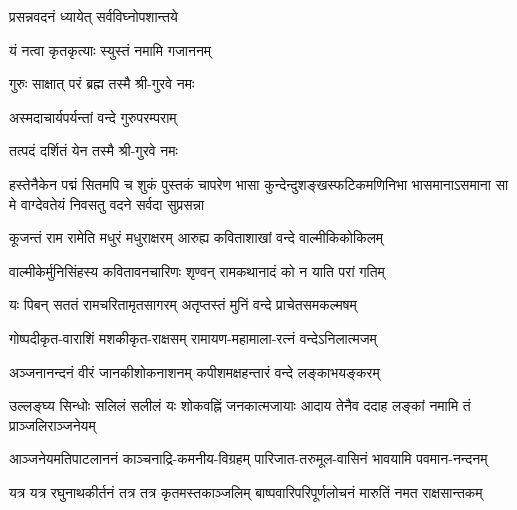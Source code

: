 

{प्रसन्नवदनं ध्यायेत् सर्वविघ्नोपशान्तये}

{यं नत्वा कृतकृत्याः स्युस्तं नमामि गजाननम्}


{गुरुः साक्षात् परं ब्रह्म तस्मै श्री-गुरवे नमः}

{अस्मदाचार्यपर्यन्तां वन्दे गुरुपरम्पराम्}

{तत्पदं दर्शितं येन तस्मै श्री-गुरवे नमः}

{हस्तेनैकेन पद्मं सितमपि च शुकं पुस्तकं चापरेण}
{भासा कुन्देन्दुशङ्खस्फटिकमणिनिभा भासमानाऽसमाना}
{सा मे वाग्देवतेयं निवसतु वदने सर्वदा सुप्रसन्ना}


\twolineshloka
{कूजन्तं राम रामेति मधुरं मधुराक्षरम्}
{आरुह्य कविताशाखां वन्दे वाल्मीकिकोकिलम्}

\twolineshloka
{वाल्मीकेर्मुनिसिंहस्य कवितावनचारिणः}
{शृण्वन् रामकथानादं को न याति परां गतिम्}

\twolineshloka
{यः पिबन् सततं रामचरितामृतसागरम्}
{अतृप्तस्तं मुनिं वन्दे प्राचेतसमकल्मषम्}

\resetShloka
{}

\twolineshloka
{गोष्पदीकृत-वाराशिं मशकीकृत-राक्षसम्}
{रामायण-महामाला-रत्नं वन्देऽनिलात्मजम्}

\twolineshloka
{अञ्जनानन्दनं वीरं जानकीशोकनाशनम्}
{कपीशमक्षहन्तारं वन्दे लङ्काभयङ्करम्}

\fourlineindentedshloka
{उल्लङ्घ्य सिन्धोः सलिलं सलीलं}
{यः शोकवह्निं जनकात्मजायाः}
{आदाय तेनैव ददाह लङ्कां}
{नमामि तं प्राञ्जलिराञ्जनेयम्}

\fourlineindentedshloka
{आञ्जनेयमतिपाटलाननं}
{काञ्चनाद्रि-कमनीय-विग्रहम्}
{पारिजात-तरुमूल-वासिनं}
{भावयामि पवमान-नन्दनम्}

\fourlineindentedshloka
{यत्र यत्र रघुनाथकीर्तनं}
{तत्र तत्र कृतमस्तकाञ्जलिम्}
{बाष्पवारिपरिपूर्णलोचनं}
{मारुतिं नमत राक्षसान्तकम्}

